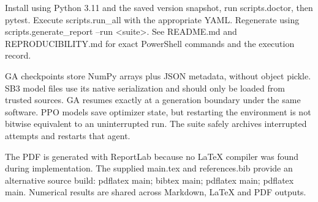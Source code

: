 \documentclass[11pt,a4paper]{article}
\begin{document}
Install using Python 3.11 and the saved version snapshot, run scripts.doctor, then pytest. Execute scripts.run\_all with the appropriate YAML. Regenerate using scripts.generate\_report --run <suite>. See README.md and REPRODUCIBILITY.md for exact PowerShell commands and the execution record.

GA checkpoints store NumPy arrays plus JSON metadata, without object pickle. SB3 model files use its native serialization and should only be loaded from trusted sources. GA resumes exactly at a generation boundary under the same software. PPO models save optimizer state, but restarting the environment is not bitwise equivalent to an uninterrupted run. The suite safely archives interrupted attempts and restarts that agent.

The PDF is generated with ReportLab because no LaTeX compiler was found during implementation. The supplied main.tex and references.bib provide an alternative source build: pdflatex main; bibtex main; pdflatex main; pdflatex main. Numerical results are shared across Markdown, LaTeX and PDF outputs.
\end{document}

